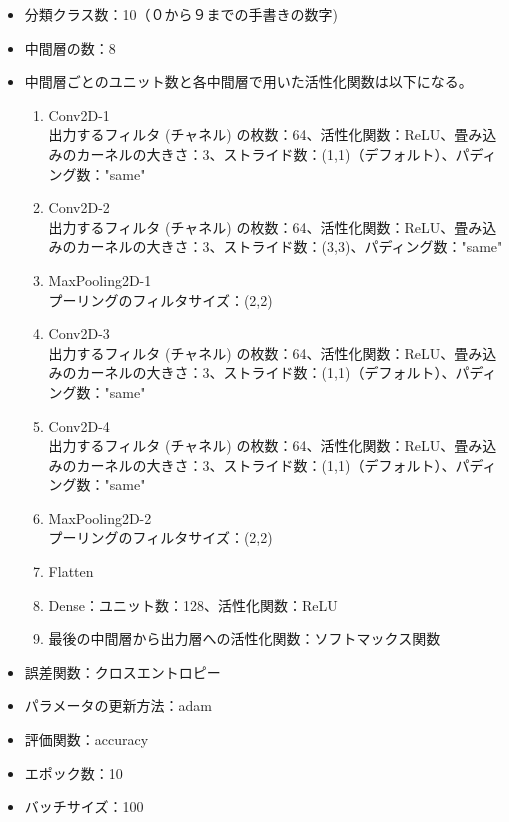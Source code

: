 \documentclass{jarticle}
\begin{document}
\begin{itemize}
  \item 分類クラス数：10（０から９までの手書きの数字)
  \item 中間層の数：8
  \item 中間層ごとのユニット数と各中間層で用いた活性化関数は以下になる。
  \begin{enumerate}
  \item Conv2D-1\\
  出力するフィルタ (チャネル) の枚数：64、活性化関数：ReLU、畳み込みのカーネルの大きさ：3、ストライド数：(1,1)（デフォルト）、パディング数："same" 
\item Conv2D-2\\
出力するフィルタ (チャネル) の枚数：64、活性化関数：ReLU、畳み込みのカーネルの大きさ：3、ストライド数：(3,3)、パディング数："same" 
\item MaxPooling2D-1\\
プーリングのフィルタサイズ：(2,2)
\item Conv2D-3\\
出力するフィルタ (チャネル) の枚数：64、活性化関数：ReLU、畳み込みのカーネルの大きさ：3、ストライド数：(1,1)（デフォルト）、パディング数："same" 
\item Conv2D-4\\
出力するフィルタ (チャネル) の枚数：64、活性化関数：ReLU、畳み込みのカーネルの大きさ：3、ストライド数：(1,1)（デフォルト）、パディング数："same" 
\item MaxPooling2D-2\\
プーリングのフィルタサイズ：(2,2)
\item Flatten
\item Dense：ユニット数：128、活性化関数：ReLU
\item 最後の中間層から出力層への活性化関数：ソフトマックス関数
\end{enumerate}
  \item 誤差関数：クロスエントロピー
  \item パラメータの更新方法：adam
 \item 評価関数：accuracy
  \item エポック数：10
  \item バッチサイズ：100\\
\end{itemize}
\end{document}

